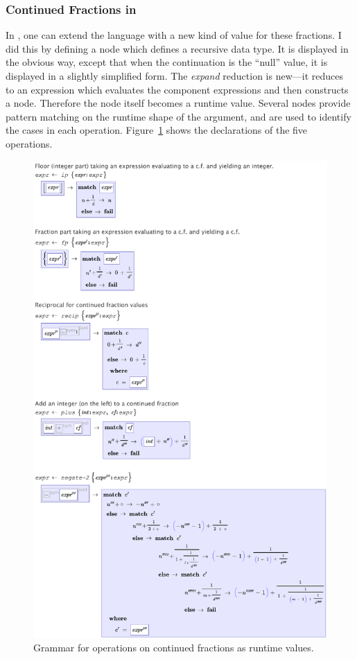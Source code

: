 \subsubsection{Continued Fractions in \Meta}
In \Meta, one can extend the language with a new kind of value for these fractions. I did this by defining a  node which defines a recursive data type. It is displayed in the obvious way, except that when the continuation is the ``null'' value, it is displayed in a slightly simplified form. The \emph{expand} reduction is new---it reduces to an expression which evaluates the component expressions and then constructs a node. Therefore the node itself becomes a runtime value. Several  nodes provide pattern matching on the runtime shape of the argument, and are used to identify the cases in each operation. Figure~\ref{fig-cf} shows the declarations of the five operations. %
\begin{figure}[th]
  \centering
  
  \includegraphics[scale=0.45]{src/image/continued-ops.pdf}
  
  \caption{Grammar for operations on continued fractions as runtime values.}
  \label{fig-cf}
\end{figure}

